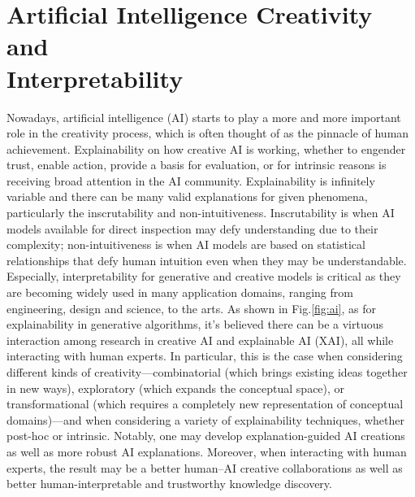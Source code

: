 \documentclass[]{article}
\begin{document}
\section{Artificial Intelligence Creativity and \\Interpretability}
Nowadays, artificial intelligence (AI) starts to play a more and more important role in the creativity process, which is often thought of as the pinnacle of human achievement. 
Explainability on how creative AI is working, whether to engender trust, enable action, provide a basis for evaluation, or for intrinsic reasons is receiving broad attention in the AI community. 
Explainability is infinitely variable and there can be many valid explanations for given phenomena, particularly the inscrutability and non-intuitiveness. 
Inscrutability is when AI models available for direct inspection may defy
understanding due to their complexity; 
non-intuitiveness is when AI models are based on statistical relationships that defy human intuition even when they may be understandable.
Especially, interpretability for generative and creative models is critical as they are becoming widely used in many application domains, ranging from engineering, design and science, to the arts.
As shown in Fig.\ref{fig:ai}, as for explainability in generative algorithms, it's believed there can be a virtuous interaction among research in creative AI and explainable AI (XAI), all while interacting with human experts. 
In particular, this is the case when considering different kinds of creativity—combinatorial (which brings existing ideas together in new ways), exploratory (which expands the conceptual space), 
or transformational (which requires a completely new representation of conceptual domains)—and when considering a variety of explainability techniques, whether post-hoc or intrinsic. 
Notably, one may develop explanation-guided AI creations as well as more robust AI explanations. 
Moreover, when interacting with human experts, the result may be a better human–AI creative collaborations as well as better human-interpretable and trustworthy knowledge discovery.
    
\end{document}
